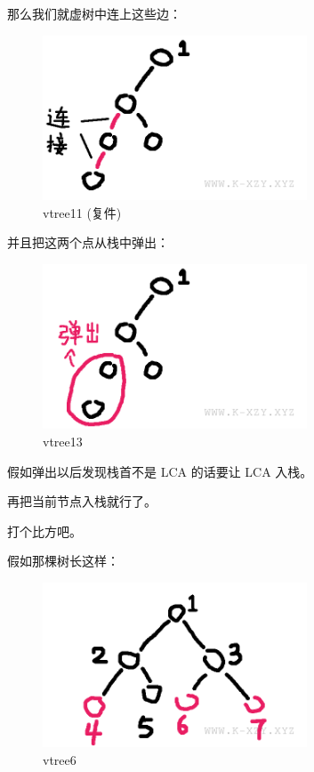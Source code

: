 那么我们就虚树中连上这些边：

\begin{figure}[htbp]
\centering
\includegraphics[width=0.7\textwidth]{docs/ds/images/vtree12.png} 
\caption{vtree11 (复件)}
\end{figure}

并且把这两个点从栈中弹出：

\begin{figure}[htbp]
\centering
\includegraphics[width=0.7\textwidth]{docs/ds/images/vtree13.png} 
\caption{vtree13}
\end{figure}

假如弹出以后发现栈首不是 LCA 的话要让 LCA 入栈。

再把当前节点入栈就行了。

打个比方吧。

假如那棵树长这样：

\begin{figure}[htbp]
\centering
\includegraphics[width=0.7\textwidth]{docs/ds/images/vtree6.png} 
\caption{vtree6}
\end{figure}

